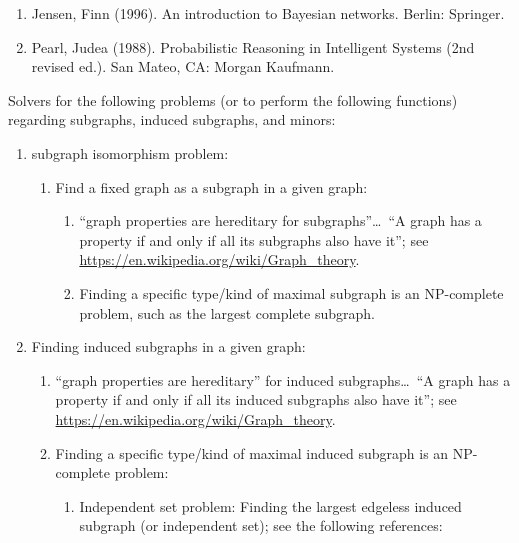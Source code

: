 \begin{enumerate}
\begin{enumerate}
\begin{enumerate}
		\item Jensen, Finn (1996). An introduction to Bayesian networks. Berlin: Springer.
		\item Pearl, Judea (1988). Probabilistic Reasoning in Intelligent Systems (2nd revised ed.). San Mateo, CA: Morgan Kaufmann. 
		\end{enumerate}
	\end{enumerate}
\end{enumerate}





Solvers for the following problems (or to perform the following functions) regarding subgraphs, induced subgraphs, and minors: \vspace{-0.3cm}
\begin{enumerate} \itemsep -4pt
\item subgraph isomorphism problem: \vspace{-0.3cm}
	\begin{enumerate} \itemsep -2pt
	\item Find a fixed graph as a subgraph in a given graph: \vspace{-0.2cm}
		\begin{enumerate} \itemsep -2pt
		\item ``graph properties are hereditary for subgraphs''\dots\ ``A graph has a property if and only if all its subgraphs also have it''; see \url{https://en.wikipedia.org/wiki/Graph_theory}.
		\item Finding a specific type/kind of maximal subgraph is an NP-complete problem, such as the largest complete subgraph.
		\end{enumerate}
	\end{enumerate}
\item Finding induced subgraphs in a given graph: \vspace{-0.3cm}
	\begin{enumerate} \itemsep -2pt
	\item ``graph properties are hereditary'' for induced subgraphs\dots\ ``A graph has a property if and only if all its induced subgraphs also have it''; see \url{https://en.wikipedia.org/wiki/Graph_theory}.
	\item Finding a specific type/kind of maximal induced subgraph is an NP-complete problem: \vspace{-0.2cm}
		\begin{enumerate} \itemsep -2pt
		\item Independent set problem: Finding the largest edgeless induced subgraph (or independent set); see the following references: \vspace{-0.1cm}

\end{enumerate}
\end{enumerate}
\end{enumerate}
